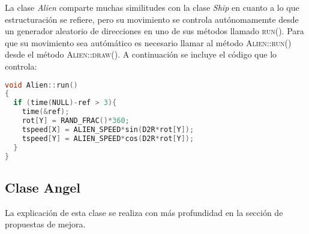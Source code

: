 La clase \emph{Alien} comparte muchas similitudes con la clase \emph{Ship} en cuanto a lo que estructuración se refiere, pero su movimiento se controla autónomamemte desde un generador aleatorio de direcciones en uno de sus métodos llamado \textsc{run()}. Para que su movimiento sea autómático es necesario llamar al método \textsc{Alien::run()} desde el método \textsc{Alien::draw()}. A continuación se incluye el código que lo controla:

\lstset{style=mystyle}
\begin{lstlisting}[language=C++, title=Movimiento errático del \emph{Alien} gracias a la función \textit{run()}, frame=single, numbers=none]
void Alien::run()
{ 
  if (time(NULL)-ref > 3){
    time(&ref);
    rot[Y] = RAND_FRAC()*360;
    tspeed[X] = ALIEN_SPEED*sin(D2R*rot[Y]);
    tspeed[Y] = ALIEN_SPEED*cos(D2R*rot[Y]);
  }
}
\end{lstlisting}

\subsection{Clase Angel}
La explicación de esta clase se realiza con más profundidad en la sección de propuestas de mejora.
